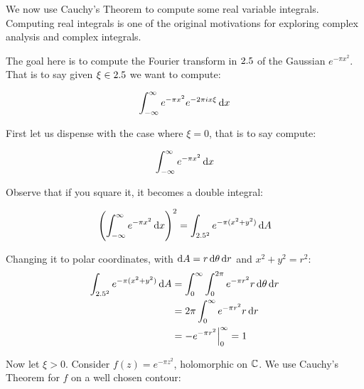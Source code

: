 We now use Cauchy's Theorem to compute some real variable integrals. Computing real integrals is one of the original motivations for exploring complex analysis and complex integrals.

\begin{example}

The goal here is to compute the Fourier transform in $2.5$ of the Gaussian $e^{- \pi x^2}$.  That is to say given $\xi \in 2.5$ we want to compute:

\begin{align*}
    \int_{-\infty}^{\infty} e^{- \pi x^2} e^{- 2 \pi i x \xi} \dif x
\end{align*}

First let us dispense with the case where $\xi = 0$, that is to say compute:

\begin{align*}
    \int_{-\infty}^{\infty} e^{- \pi x^2} \dif x
\end{align*}

Observe that if you square it, it becomes a double integral:

\begin{align*}
    \left(  \int_{-\infty}^{\infty} e^{- \pi x^2}  \dif x \right)^2 = \int_{\R ^2}  e^{- \pi( x^2+y^2)}  \dif A
\end{align*}

Changing it to polar coordinates, with $\dif A = r \dif \theta \dif r $ and $x^2+y^2 = r^2$:
\begin{align*}
    \int_{\R ^2}  e^{- \pi( x^2+y^2)}  \dif A &= \int_{0}^{\infty} \int_{0}^{2 \pi} e^{- \pi r^2}  r \dif \theta \dif r \\
    &= 2 \pi \int_{0}^{\infty}  e^{- \pi r^2}  r \dif r \\
    &= -e^{-\pi r^2} \Bigr|_0^\infty = 1\\
\end{align*}

Now let $\xi > 0$. Consider $f(z) =  e^{- \pi z^2}$, holomorphic on $\mathbb{C}$. We use Cauchy's Theorem for $f$ on a well chosen contour:

\begin{center}
\end{center}
\end{example}
